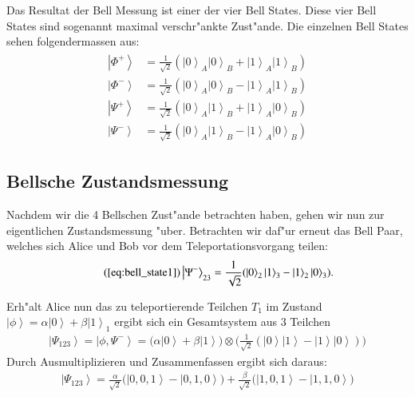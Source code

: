 \begin{refsection}
Das Resultat der Bell Messung ist einer der vier Bell States. Diese vier Bell States sind sogenannt maximal verschr"ankte Zust"ande. Die einzelnen Bell States sehen folgendermassen aus:
\begin{align}
	\begin{split}
\left|\Phi^+\right\rangle & = \frac{1}{\sqrt{2}}(\left|0\right\rangle_{A}\left|0\right\rangle_{B} + \left|1\right\rangle_{A}\left|1\right\rangle_{B}) \\
\left|\Phi^-\right\rangle & = \frac{1}{\sqrt{2}}(\left|0\right\rangle_{A}\left|0\right\rangle_{B} - \left|1\right\rangle_{A}\left|1\right\rangle_{B}) \\
\left|\Psi^+\right\rangle & = \frac{1}{\sqrt{2}}(\left|0\right\rangle_{A}\left|1\right\rangle_{B} + \left|1\right\rangle_{A}\left|0\right\rangle_{B}) \\
\left|\Psi^-\right\rangle & = \frac{1}{\sqrt{2}}(\left|0\right\rangle_{A}\left|1\right\rangle_{B} - \left|1\right\rangle_{A}\left|0\right\rangle_{B}) 
	\end{split}
\end{align}

\subsection{Bellsche Zustandsmessung}\label{sec:bell-measurement}

Nachdem wir die 4 Bellschen Zust"ande betrachten haben, gehen wir nun zur eigentlichen Zustandsmessung "uber. Betrachten wir daf"ur erneut das Bell Paar, welches sich Alice und Bob vor dem Teleportationsvorgang teilen:
\begin{align}  \tag{\ref{eq:bell_state1}}
 \left|\Psi^{-}\right\rangle_{23} = \frac{1}{\sqrt{2}} ( \left|0\right\rangle_{2}\left|1\right\rangle_{3} - \left|1\right\rangle_{2}\left|0\right\rangle_{3} ).
\end{align}

Erh"alt Alice nun das zu teleportierende Teilchen $T_{1}$ im Zustand $\left|\phi\right\rangle = \alpha\left|0\right\rangle + \beta\left|1\right\rangle_{1}$ ergibt sich ein Gesamtsystem aus 3 Teilchen
\begin{align}\label{eq:full_system1}
\left|\Psi_{123}\right\rangle = \left| \phi, \Psi^{-} \right\rangle = \big( \alpha \left| 0 \right\rangle + \beta \left| 1 \right\rangle \big) \otimes \big( \frac{1}{\sqrt{2}} ( \left|0\right\rangle \left|1\right\rangle - \left|1\right\rangle \left|0\right\rangle ) \big)
\end{align}
Durch Ausmultiplizieren und Zusammenfassen ergibt sich daraus:
\begin{align}\label{eq:full_system2}
\left|\Psi_{123}\right\rangle = \frac{\alpha}{\sqrt{2}} \big(\left|0, 0, 1 \right\rangle - \left|0, 1, 0 \right\rangle  \big) + \frac{\beta}{\sqrt{2}} \big(\left|1, 0, 1 \right\rangle - \left|1, 1, 0 \right\rangle \big)
\end{align}


\end{refsection}
